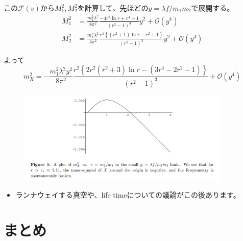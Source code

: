 \documentclass[
  unicode,a4paper,9pt,
  xcolor = {dvipsnames,svgnames},
  hyperref ={colorlinks=true,citecolor=Navy,linkcolor=NavyBlue,urlcolor=purple},
  ja=standard,lualatex
]{beamer}
\begin{document}
\begin{frame}

  この$\mathcal{F}(v)$から$M_{1}^2, M_{2}^{2}$を計算して、先ほどの$y=\lambda f/m_{1}m_{2}$で展開する。
  \begin{align}
    M_{1}^2
     & =
    \frac{m_{1}^2\lambda^2}{8\pi^2}
    \frac{-4r^2\ln r+r^4-1}{(r^2-1)^3}
    y^2
    +
    \mathcal{O}(y^4)
    \nonumber
    \\
    M_{2}^2
     & =
    \frac{m_{1}^2\lambda^2}{4\pi^2}
    \frac{r^4\left\{ (r^2+1)\ln r-r^2+1 \right\}}{(r^2-1)^3}
    y^2
    +
    \mathcal{O}(y^4)
    \nonumber
  \end{align}

  よって
  \begin{equation}
    m_{X}^2
    =
    -
    \frac{m_{1}^2\lambda^2 y^2}{8\pi^2}
    \dfrac{r^2 \left\{ 2r^2(r^2+3)\ln r-(3r^4-2r^2-1) \right\}}{(r^2-1)^3}
    +
    \mathcal{O}(y^4)
    \nonumber
  \end{equation}

  \begin{figure}
    \centering
    \includegraphics[width=0.9\textwidth]{fig/Shih2007avfig.PNG}
  \end{figure}

\end{frame}

\begin{frame}

  \begin{itemize}
    \item
    ランナウェイする真空や、life timeについての議論がこの後あります。

  \end{itemize}

\end{frame}


\section{まとめ}
\end{document}
